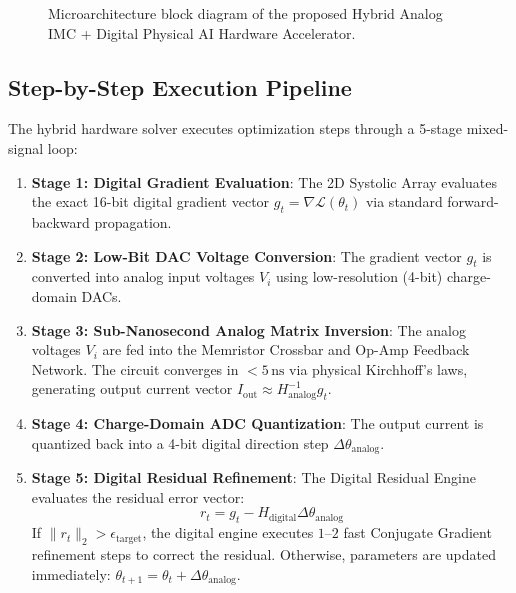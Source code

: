 \begin{figure}[htbp]
\caption{Microarchitecture block diagram of the proposed Hybrid Analog IMC + Digital Physical AI Hardware Accelerator.}
\label{fig:ch13_hybrid_architecture}
\end{figure}

\subsection{Step-by-Step Execution Pipeline}
The hybrid hardware solver executes optimization steps through a 5-stage mixed-signal loop:

\begin{enumerate}[leftmargin=*]
    \item \textbf{Stage 1: Digital Gradient Evaluation}: The 2D Systolic Array evaluates the exact 16-bit digital gradient vector $g_t = \nabla \mathcal{L}(\theta_t)$ via standard forward-backward propagation.
    \item \textbf{Stage 2: Low-Bit DAC Voltage Conversion}: The gradient vector $g_t$ is converted into analog input voltages $V_i$ using low-resolution (4-bit) charge-domain DACs.
    \item \textbf{Stage 3: Sub-Nanosecond Analog Matrix Inversion}: The analog voltages $V_i$ are fed into the Memristor Crossbar and Op-Amp Feedback Network. The circuit converges in $<5\,\text{ns}$ via physical Kirchhoff's laws, generating output current vector $I_{\text{out}} \approx H_{\text{analog}}^{-1} g_t$.
    \item \textbf{Stage 4: Charge-Domain ADC Quantization}: The output current is quantized back into a 4-bit digital direction step $\Delta \theta_{\text{analog}}$.
    \item \textbf{Stage 5: Digital Residual Refinement}: The Digital Residual Engine evaluates the residual error vector:
    \begin{equation}
    r_t = g_t - H_{\text{digital}} \Delta \theta_{\text{analog}}
    \end{equation}
    If $\|r_t\|_2 > \epsilon_{\text{target}}$, the digital engine executes $1$--$2$ fast Conjugate Gradient refinement steps to correct the residual. Otherwise, parameters are updated immediately: $\theta_{t+1} = \theta_t + \Delta \theta_{\text{analog}}$.
\end{enumerate}


